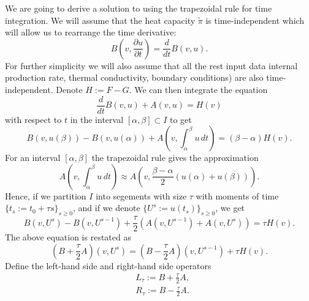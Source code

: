 \begin{discussion}
  \label{cmc/diffusion/discrete/transient/primal_weak_solve_trapezoidal-discussion}
  We are going to derive a solution to
  using the trapezoidal rule for time integration.
  We will assume that the heat capacity $\tilde{\pi}$ is time-independent which will
  allow us to rearrange the time derivative:
  \begin{equation}
    B(v, \frac{\partial u} {\partial t}) = \frac{d}{d t} B(v, u).
  \end{equation}
  For further simplicity we will also assume that all the rest input data
  internal production rate, thermal conductivity, boundary conditions)
  are also time-independent.
  Denote $H := F - G$.
  We can then integrate the equation
  \begin{equation}
    \frac{d}{d t} B(v, u) + A(v, u) = H(v)
  \end{equation}
  with respect to $t$ in the interval $[\alpha, \beta] \subset I$ to get
  \begin{equation}
    B(v, u(\beta)) - B(v, u(\alpha))
    + A(v, \int_\alpha^\beta u\, d t)
    = (\beta - \alpha) H(v).
  \end{equation}
  For an interval $[\alpha, \beta]$ the trapezoidal rule gives the approximation
  \begin{equation}
    A(v, \int_\alpha^\beta u\, d t)
    \approx A(v, \frac{\beta - \alpha}{2} (u(\alpha) + u(\beta))).
  \end{equation}
  Hence, if we partition $I$ into segements with size $\tau$ with moments of
  time $\{t_s := t_0 + \tau s\}_{s \geq 0}$, and if we denote
  $\{U^s := u(t_s)\}_{s \geq 0}$, we get
  \begin{equation}
    B(v, U^s) - B(v, U^{s - 1})
    + \frac{\tau}{2} (A(v, U^{s - 1}) + A(v, U^s))
    = \tau H(v).
  \end{equation}
  The above equation is restated as
  \begin{equation}
    (B + \frac{\tau}{2} A)(v, U^s)
    = (B - \frac{\tau}{2} A)(v, U^{s - 1}) + \tau H(v).
  \end{equation}
  Define the left-hand side and right-hand side operators
  \begin{subequations}
    \begin{alignat}{1}
      & L_\tau := B + \frac{\tau}{2} A, \\
      & R_\tau := B - \frac{\tau}{2} A.
    \end{alignat}

\end{subequations}
\end{discussion}
